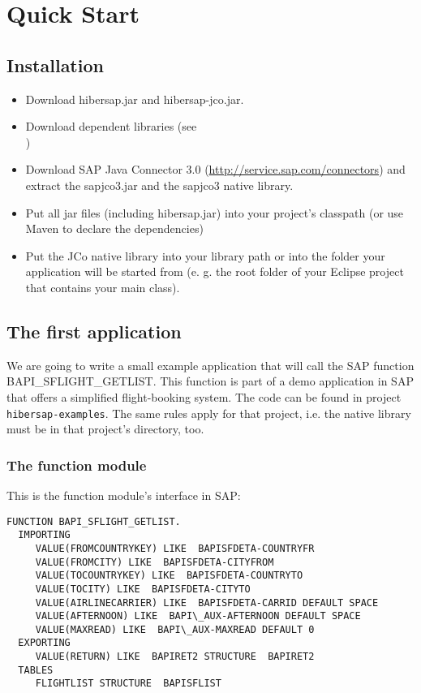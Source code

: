 \chapter{Quick Start}
\label{cha:QuickStart}

\section{Installation}

\begin{itemize}
  \item Download hibersap.jar and hibersap-jco.jar. 
  \item Download dependent libraries (see \\ \urlHibersapDependencies)
  \item Download SAP Java Connector 3.0 (\url{http://service.sap.com/connectors}) and extract the sapjco3.jar and the
  sapjco3 native library. 
  \item Put all jar files (including hibersap.jar) into your project's classpath (or use Maven to declare the
  dependencies)
  \item Put the JCo native library into your library path or into the folder your application will be started
    from (e. g. the root folder of your Eclipse project that contains your main class).
\end{itemize} 


\section{The first application}

We are going to write a small example application that will call the SAP function BAPI\_\-SFLIGHT\_\-GETLIST.
This function is part of a demo application in SAP that offers a simplified flight-booking system.
The code can be found in project {\tt hibersap-examples}. The same rules apply for that project, i.e. the native
library must be in that project's directory, too.


\subsection{The function module}

This is the function module's interface in SAP:

\begin{Verbatim}[frame=single,label=The ABAP Function]
FUNCTION BAPI_SFLIGHT_GETLIST.
  IMPORTING
     VALUE(FROMCOUNTRYKEY) LIKE  BAPISFDETA-COUNTRYFR
     VALUE(FROMCITY) LIKE  BAPISFDETA-CITYFROM
     VALUE(TOCOUNTRYKEY) LIKE  BAPISFDETA-COUNTRYTO
     VALUE(TOCITY) LIKE  BAPISFDETA-CITYTO
     VALUE(AIRLINECARRIER) LIKE  BAPISFDETA-CARRID DEFAULT SPACE
     VALUE(AFTERNOON) LIKE  BAPI\_AUX-AFTERNOON DEFAULT SPACE
     VALUE(MAXREAD) LIKE  BAPI\_AUX-MAXREAD DEFAULT 0
  EXPORTING
     VALUE(RETURN) LIKE  BAPIRET2 STRUCTURE  BAPIRET2
  TABLES
     FLIGHTLIST STRUCTURE  BAPISFLIST
\end{Verbatim}

